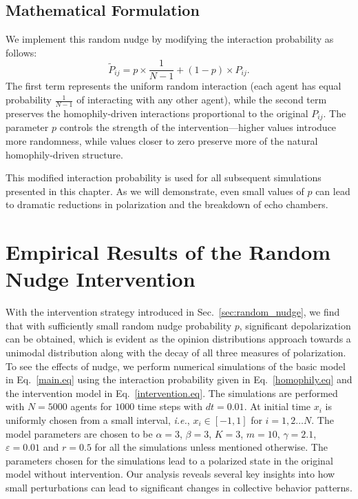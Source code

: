 \subsection{Mathematical Formulation}
We implement this random nudge by modifying the interaction probability as follows:
\begin{equation}
    \label{intervention.eq}
    \widetilde P_{ij} = p \times \frac{1}{N - 1} + (1 - p) \times P_{ij}.
\end{equation}
The first term represents the uniform random interaction (each agent has equal probability $\frac{1}{N-1}$ of interacting with any other agent), while the second term preserves the homophily-driven interactions proportional to the original $P_{ij}$. The parameter $p$ controls the strength of the intervention—higher values introduce more randomness, while values closer to zero preserve more of the natural homophily-driven structure.

This modified interaction probability is used for all subsequent simulations presented in this chapter. As we will demonstrate, even small values of $p$ can lead to dramatic reductions in polarization and the breakdown of echo chambers.
\section{Empirical Results of the Random Nudge Intervention}
\label{sec:results}
With the intervention strategy introduced in Sec.~\ref{sec:random_nudge}, we find that with sufficiently small random nudge probability $p$, significant depolarization can be obtained, which is evident as the opinion distributions approach towards a unimodal distribution along with the decay of all three measures of polarization. To see the effects of nudge, we perform numerical simulations of the basic model in Eq.~\eqref{main.eq} using the interaction probability given in Eq.~\eqref{homophily.eq} and the intervention model in Eq.~\eqref{intervention.eq}. The simulations are performed with $N=5000$ agents for $1000$ time steps with $dt=0.01$. At initial time $x_i$ is uniformly chosen from a small interval, {\it i.e.}, $x_i \in [-1,1]$ for $i=1,2 \dots N$. The model parameters are chosen to be $\alpha=3$, $\beta=3$, $K=3$, $m=10$, $\gamma=2.1$, $\varepsilon=0.01$ and $r=0.5$ for all the simulations unless mentioned otherwise. The parameters chosen for the simulations lead to a polarized state in the original model without intervention. Our analysis reveals several key insights into how small perturbations can lead to significant changes in collective behavior patterns.
